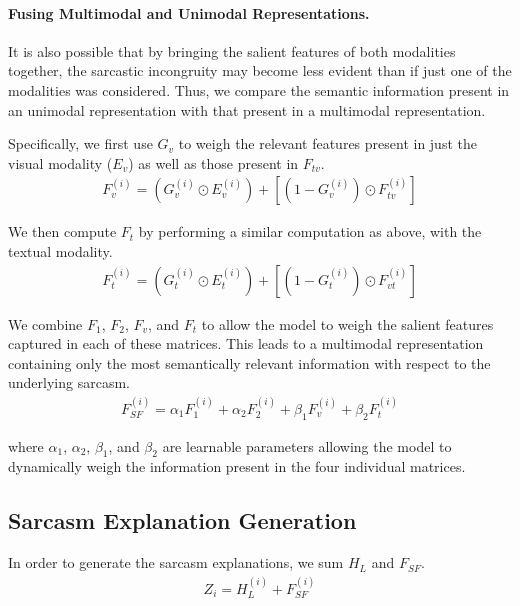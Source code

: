 \paragraph{Fusing Multimodal and Unimodal Representations.} It is also possible that by bringing the salient features of both modalities together, the sarcastic incongruity may become less evident than if just one of the modalities was considered. Thus, we compare the semantic information present in an unimodal representation with that present in a multimodal representation. 

Specifically, we first use $G_v$ to weigh the relevant features present in just the visual modality ($E_v$) as well as those present in $F_{tv}$.  
\begin{equation}
    \label{eq: Fv}
    \begin{aligned}
        F_v^{(i)} = (G_v^{(i)} \odot E_v^{(i)}) + [(1-G_v^{(i)}) \odot F_{tv}^{(i)}]
    \end{aligned}
\end{equation}

We then compute $F_t$ by performing a similar computation as above, with the textual modality. 
\begin{equation}
    \label{eq: Ft}
    \begin{aligned}
        F_t^{(i)} = (G_t^{(i)} \odot E_t^{(i)}) + [(1-G_t^{(i)}) \odot F_{vt}^{(i)}]
    \end{aligned}
\end{equation}

We combine $F_1$, $F_2$, $F_v$, and $F_t$ to allow the model to weigh the salient features captured in each of these matrices. This leads to a multimodal representation containing only the most semantically relevant information with respect to the underlying sarcasm. 
\begin{equation}
    \label{eq: sf-out}
    \begin{aligned}
        F_{SF}^{(i)} = \alpha_1F_1^{(i)} + \alpha_2F_2^{(i)} + \beta_1F_v^{(i)} + \beta_2F_t^{(i)}
    \end{aligned}
\end{equation}

where $\alpha_1$, $\alpha_2$, $\beta_1$, and $\beta_2$ are learnable parameters allowing the model to dynamically weigh the information present in the four individual matrices. 

\subsection{Sarcasm Explanation Generation}
In order to generate the sarcasm explanations, we sum $H_L$ and $F_{SF}$.
\begin{equation}
    \label{eq: encoder-inp}
    \begin{aligned}
        Z_i = H_L^{(i)} + F_{SF}^{(i)}
    \end{aligned}
\end{equation}

